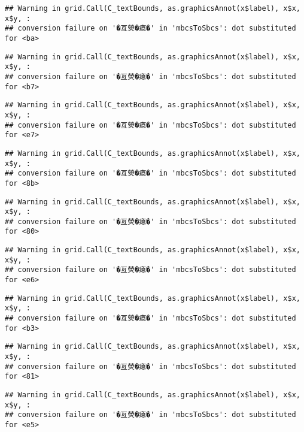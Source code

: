 \documentclass[
]{article}
\begin{document}
\begin{verbatim}
## Warning in grid.Call(C_textBounds, as.graphicsAnnot(x$label), x$x, x$y, :
## conversion failure on '�亙熒�瘜�' in 'mbcsToSbcs': dot substituted for <ba>
\end{verbatim}

\begin{verbatim}
## Warning in grid.Call(C_textBounds, as.graphicsAnnot(x$label), x$x, x$y, :
## conversion failure on '�亙熒�瘜�' in 'mbcsToSbcs': dot substituted for <b7>
\end{verbatim}

\begin{verbatim}
## Warning in grid.Call(C_textBounds, as.graphicsAnnot(x$label), x$x, x$y, :
## conversion failure on '�亙熒�瘜�' in 'mbcsToSbcs': dot substituted for <e7>
\end{verbatim}

\begin{verbatim}
## Warning in grid.Call(C_textBounds, as.graphicsAnnot(x$label), x$x, x$y, :
## conversion failure on '�亙熒�瘜�' in 'mbcsToSbcs': dot substituted for <8b>
\end{verbatim}

\begin{verbatim}
## Warning in grid.Call(C_textBounds, as.graphicsAnnot(x$label), x$x, x$y, :
## conversion failure on '�亙熒�瘜�' in 'mbcsToSbcs': dot substituted for <80>
\end{verbatim}

\begin{verbatim}
## Warning in grid.Call(C_textBounds, as.graphicsAnnot(x$label), x$x, x$y, :
## conversion failure on '�亙熒�瘜�' in 'mbcsToSbcs': dot substituted for <e6>
\end{verbatim}

\begin{verbatim}
## Warning in grid.Call(C_textBounds, as.graphicsAnnot(x$label), x$x, x$y, :
## conversion failure on '�亙熒�瘜�' in 'mbcsToSbcs': dot substituted for <b3>
\end{verbatim}

\begin{verbatim}
## Warning in grid.Call(C_textBounds, as.graphicsAnnot(x$label), x$x, x$y, :
## conversion failure on '�亙熒�瘜�' in 'mbcsToSbcs': dot substituted for <81>
\end{verbatim}

\begin{verbatim}
## Warning in grid.Call(C_textBounds, as.graphicsAnnot(x$label), x$x, x$y, :
## conversion failure on '�亙熒�瘜�' in 'mbcsToSbcs': dot substituted for <e5>
\end{verbatim}
\end{document}
